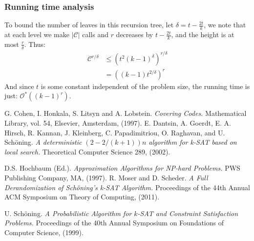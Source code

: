 \documentclass[a4paper,12pts]{article}
\renewcommand{\O}{\mathcal{O}^*}
\begin{document}
\subsubsection{Running time analysis}
	To bound the number of leaves in this recursion tree, let $\delta = t-\frac{2t}{k}$, we note that at each level we make $|\mathcal{C}|$ calls and $r$ decreases by $t-\frac{2t}{k}$, and the height is at most $\frac{r}{\delta}$. Thus:
	\begin{align*}
	\mathcal{C}^{r/\delta} &\leq (t^{2}(k-1)^{\delta})^{r/\delta}\\
	&= ((k-1)t^{2/\delta})^{r}
	\end{align*}
	And since $t$ is some constant independent of the problem size, the running time is just: $\O((k-1)^{r})$.
\begin{thebibliography}{9}
	
G. Cohen, I. Honkala, S. Litsyn and A. Lobstein.
\textit{Covering Codes.}
Mathematical Library, vol. 54, Elsevier, Amsterdam, (1997).
E. Dantsin, A. Goerdt, E. A. Hirsch, R. Kannan, J. Kleinberg, C. Papadimitriou, O. Raghavan, and U. Sch\"{o}ning. 
\textit{A deterministic $(2-2/(k+1))n$ algorithm for k-SAT based on local search.} Theoretical Computer Science 289, (2002).

D.S. Hochbaum (Ed.).
\textit{Approximation Algorithms for NP-hard Problems.}
PWS Publishing Company, MA, (1997).
R. Moser and D. Scheder.
\textit{A Full Derandomization of Sch\"{o}ning’s k-SAT Algorithm.} Proceedings of the 44th Annual ACM Symposium on Theory of Computing, (2011).

U. Sch\"{o}ning.
\textit{A Probabilistic Algorithm for $k$-SAT and Constraint Satisfaction Problems.} Proceedings of the 40th Annual Symposium on Foundations of Computer Science, (1999).

\end{thebibliography}
\end{document}
